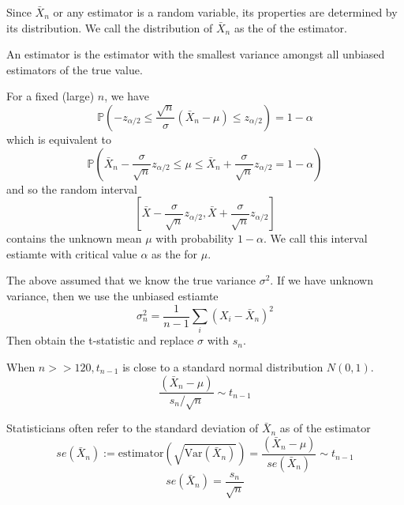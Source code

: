 \documentclass[12pt]{scrartcl}
\newcommand{\V}{\text{Var}}
\newcommand{\PP}{\mathbb{P}}
\begin{document}
\begin{definition}
  Since $\bar{X}_n$ or any estimator is a random variable, its properties are determined 
  by its distribution. We call the distribution of $\bar{X}_n$ as the  of the estimator.
\end{definition}

\begin{definition}
\end{definition}

\begin{definition}
  An  estimator is the estimator with the smallest variance amongst all 
  unbiased estimators of the true value.
\end{definition}

\begin{example}
  For a fixed (large) $n$, we have 
  \[\PP(-z_{\alpha/2} \leq \frac{\sqrt{n}}{\sigma}(\bar{X}_n - \mu) \leq z_{\alpha/2}) = 1-\alpha\]
  which is equivalent to 
  \[\PP(\bar{X}_n - \frac{\sigma}{\sqrt{n}} z_{\alpha/2} \leq \mu \leq \bar{X}_n + \frac{\sigma}{\sqrt{n}}z_{\alpha/2} = 1-\alpha)\]
  and so the random interval 
  \[[\bar{X} - \frac{\sigma}{\sqrt{n}}z_{\alpha/2}, \bar{X} + \frac{\sigma}{\sqrt{n}}z_{\alpha/2}]\]
  contains the unknown mean $\mu$ with probability $1-\alpha$. We call this interval estiamte with 
  critical value $\alpha$ as the  for $\mu$.
\end{example}

\begin{example}
  The above assumed that we know the true variance $\sigma^2$. If we have unknown variance, 
  then we use the unbiased estiamte
  \[\sigma^2_n = \frac{1}{n-1}\sum_i (X_i - \bar{X}_n)^2\]
  Then obtain the t-statistic and replace $\sigma$ with $s_n$.
\end{example}

\begin{note}
  When $n >> 120, t_{n-1}$ is close to a standard normal distribution $N(0, 1)$.
  \[\dfrac{(\bar{X}_n - \mu)}{s_n / \sqrt{n}} \sim t_{n-1}\]
\end{note}

\begin{note}
  Statisticians often refer to the standard deviation of $\bar{X}_n$ as  of the 
  estimator 
  \[se(\bar{X}_n) := \text{estimator}(\sqrt{\V(\bar{X}_n)}) = \dfrac{(\bar{X}_n - \mu)}{se(\bar{X}_n)} \sim t_{n-1}\]
  \[se(\bar{X}_n) = \frac{s_n}{\sqrt{n}}\]
\end{note}
\end{document}
